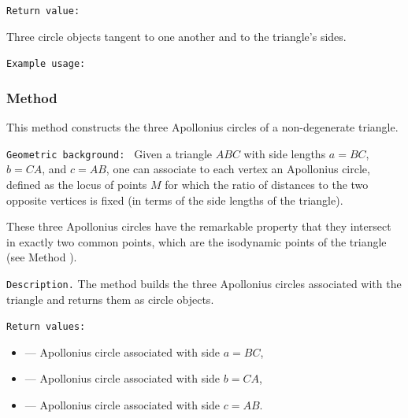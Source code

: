 \texttt{Return value: }

Three circle objects tangent to one another and to the triangle’s sides.


\texttt{Example usage: }


\subsubsection{Method }
\label{ssub:three_apollonius_circles}

This method constructs the three Apollonius circles of a non-degenerate triangle.

\medskip
\texttt{Geometric background: }
Given a triangle $ABC$ with side lengths $a = BC$, $b = CA$, and $c = AB$, one can
associate to each vertex an Apollonius circle, defined as the locus of points $M$
for which the ratio of distances to the two opposite vertices is fixed
(in terms of the side lengths of the triangle).

These three Apollonius circles have the remarkable property that they intersect
in exactly two common points, which are the isodynamic points of the triangle
(see Method ).

\medskip
\texttt{Description.}
The method  builds the three Apollonius circles
associated with the triangle and returns them as circle objects.

\medskip
\texttt{Return values: }
\begin{itemize}
  \item {} — Apollonius circle associated with side $a = BC$,
  \item {} — Apollonius circle associated with side $b = CA$,
  \item {} — Apollonius circle associated with side $c = AB$.
\end{itemize}

